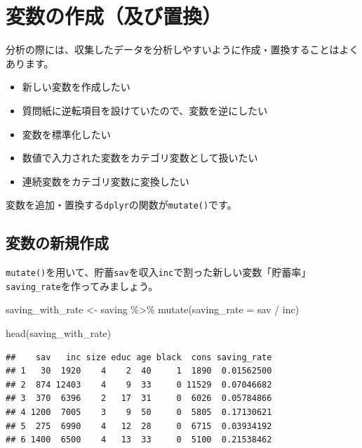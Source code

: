 \documentclass[
]{book}
\newenvironment{Shaded}{\begin{snugshade}}{\end{snugshade}}
\newcommand{\AttributeTok}[1]{\textcolor[rgb]{0.77,0.63,0.00}{#1}}
\newcommand{\FunctionTok}[1]{\textcolor[rgb]{0.00,0.00,0.00}{#1}}
\newcommand{\NormalTok}[1]{#1}
\newcommand{\OtherTok}[1]{\textcolor[rgb]{0.56,0.35,0.01}{#1}}
\newcommand{\SpecialCharTok}[1]{\textcolor[rgb]{0.00,0.00,0.00}{#1}}
\providecommand{\tightlist}{%
  \setlength{\itemsep}{0pt}\setlength{\parskip}{0pt}}
\begin{document}
\hypertarget{ux5909ux6570ux306eux4f5cux6210ux53caux3073ux7f6eux63db}{%
\section{変数の作成（及び置換）}\label{ux5909ux6570ux306eux4f5cux6210ux53caux3073ux7f6eux63db}}

分析の際には、収集したデータを分析しやすいように作成・置換することはよくあります。

\begin{itemize}
\tightlist
\item
  新しい変数を作成したい
\item
  質問紙に逆転項目を設けていたので、変数を逆にしたい
\item
  変数を標準化したい
\item
  数値で入力された変数をカテゴリ変数として扱いたい
\item
  連続変数をカテゴリ変数に変換したい
\end{itemize}

変数を追加・置換する\texttt{dplyr}の関数が\texttt{mutate()}です。

\hypertarget{ux5909ux6570ux306eux65b0ux898fux4f5cux6210}{%
\subsection{変数の新規作成}\label{ux5909ux6570ux306eux65b0ux898fux4f5cux6210}}

\texttt{mutate()}を用いて、貯蓄\texttt{sav}を収入\texttt{inc}で割った新しい変数「貯蓄率」\texttt{saving\_rate}を作ってみましょう。

\begin{Shaded}
\begin{Highlighting}[]
\NormalTok{saving\_with\_rate }\OtherTok{\textless{}{-}}
\NormalTok{  saving }\SpecialCharTok{\%\textgreater{}\%}
    \FunctionTok{mutate}\NormalTok{(}\AttributeTok{saving\_rate =}\NormalTok{ sav }\SpecialCharTok{/}\NormalTok{ inc)}

\FunctionTok{head}\NormalTok{(saving\_with\_rate)}
\end{Highlighting}
\end{Shaded}

\begin{verbatim}
##    sav   inc size educ age black  cons saving_rate
## 1   30  1920    4    2  40     1  1890  0.01562500
## 2  874 12403    4    9  33     0 11529  0.07046682
## 3  370  6396    2   17  31     0  6026  0.05784866
## 4 1200  7005    3    9  50     0  5805  0.17130621
## 5  275  6990    4   12  28     0  6715  0.03934192
## 6 1400  6500    4   13  33     0  5100  0.21538462
\end{verbatim}
\end{document}
